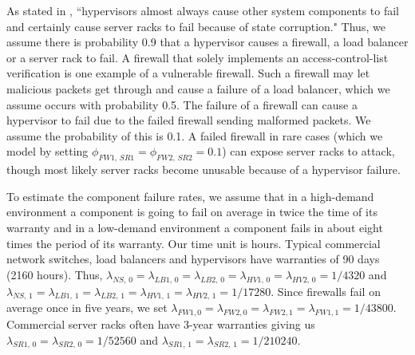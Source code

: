 \documentclass[12pt]{article}
\begin{document}
\iffalse We assume that failure of any component causes a downward-propagating
cascading failure because components on levels below the failed component end
up going offline and reach a dormant state. The propagation cannot continue
via firewalls onto server racks because although the failure of a firewall
renders server racks vulnerable, they are still ``online". To comply with our
model, dormancy is treated as a failure. We define the public Internet to be
at $depth$ 0, the network switch to be at $depth = 1$ and so on. Thus for the
downward-propagating cascading failure, $\phi_{i, \, j} = 1$ satisfying $i, j
\in \Omega, \; depth(j) = depth(i) + 1$ where $i$ and $j$ are on the same
side. \fi As stated in \cite{ReHype:2011}, ``hypervisors almost always cause
other system components to fail and certainly cause server racks to fail
because of state corruption." Thus, we assume there is probability 0.9 that a
hypervisor causes a firewall, a load balancer or a server rack to fail. A
firewall that solely implements an access-control-list verification is one
example of a vulnerable firewall. Such a firewall may let malicious packets
get through and cause a failure of a load balancer, which we assume occurs
with probability 0.5. The failure of a firewall can cause a hypervisor to fail
due to the failed firewall sending malformed packets. We assume the
probability of this is 0.1. A failed firewall in rare cases (which we model by
setting $\phi_{FW1, \, SR1} = \phi_{FW2, \, SR2} = 0.1$) can expose server
racks to attack, though most likely server racks become unusable because of a
hypervisor failure.

To estimate the component failure rates, we assume that in a high-demand
environment a component is going to fail on average in twice the time of its
warranty and in a low-demand environment a component fails in about eight
times the period of its warranty. Our time unit is hours. Typical commercial
network switches, load balancers and hypervisors have warranties of 90 days
(2160 hours). Thus, $\lambda_{NS, \, 0} = \lambda_{LB1, \, 0} =
\lambda_{LB2, \, 0} = \lambda_{HV1, \, 0} = \lambda_{HV2, \, 0} =
1 / 4320$ and $\lambda_{NS, \, 1} = \lambda_{LB1, \, 1} = \lambda_{LB2,
\, 1} = \lambda_{HV1, \, 1} = \lambda_{HV2, \, 1} = 1 / 17280$. Since
firewalls fail on average once in five years, we set $\lambda_{FW1, 0} =
\lambda_{FW2, 0} = \lambda_{FW2, 1} = \lambda_{FW1, 1} = 1 / 43800 $.
Commercial server racks often have 3-year warranties giving us $\lambda_{SR1,
\, 0} = \lambda_{SR2, \, 0} = 1 / 52560$ and $\lambda_{SR1, \, 1} =
\lambda_{SR2, \, 1} = 1 / 210240$.
\end{document}
